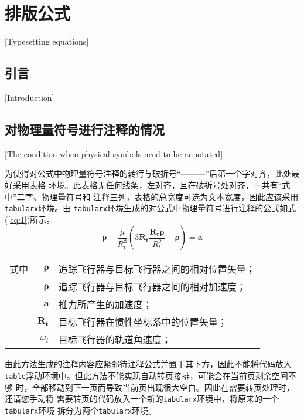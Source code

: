 
\chapter{排版公式}[Typesetting equations]

\section{引言}[Introduction]

\lipsum[1]

\section{对物理量符号进行注释的情况}[The condition when physical symbols
need to be annotated]

为使得对公式中物理量符号注释的转行与破折号“———”后第一个字对齐，此处最好采用表格
环境。此表格无任何线条，左对齐，且在破折号处对齐，一共有“式中”二字、物理量符号和
注释三列，表格的总宽度可选为文本宽度，因此应该采用\verb|tabularx|环境。由
\verb|tabularx|环境生成的对公式中物理量符号进行注释的公式如式(\ref{eq:1})所示。
\begin{equation}\label{eq:1}
\ddot{\bm{\rho}}-\frac{\mu}{R_{t}^{3}}\left(3\bm{R_{t}}\frac{\bm{R_{t}\rho}}{R_{t}^{2}}-\bm{\rho}\right)=\bm{a}
\end{equation}
\begin{tabularx}{\textwidth}{@{}l@{\quad}r@{———}X@{}}
式中& $\bm{\rho}$ &追踪飞行器与目标飞行器之间的相对位置矢量；\\
&  $\bm{\ddot{\rho}}$&追踪飞行器与目标飞行器之间的相对加速度；\\
&  $\bm{a}$   &推力所产生的加速度；\\
&  $\bm{R_t}$ & 目标飞行器在惯性坐标系中的位置矢量；\\
&  $\omega_{t}$ & 目标飞行器的轨道角速度；\\
\end{tabularx}\vspace{3.15bp}
由此方法生成的注释内容应紧邻待注释公式并置于其下方，因此不能将代码放入
\verb|table|浮动环境中。但此方法不能实现自动转页接排，可能会在当前页剩余空间不够
时，全部移动到下一页而导致当前页出现很大空白。因此在需要转页处理时，还请您手动将
需要转页的代码放入一个新的\verb|tabularx|环境中，将原来的一个\verb|tabularx|环境
拆分为两个\verb|tabularx|环境。

